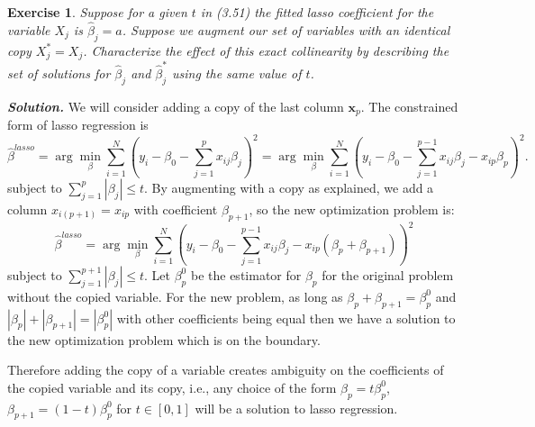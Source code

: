 \documentclass[12pt]{article}
\def\bx{\textbf{x}}
\newtheorem{exercise}{Exercise}[section]
\newenvironment{solution}[1][\it{Solution}]{\textbf{#1. } }{\vspace{.5cm}}
\begin{document}
\begin{exercise}
    Suppose for a given $t$ in (3.51) the fitted lasso coefficient for the variable $X_j$ is $\hat{\beta}_j = a$. Suppose we augment our set of variables with an identical copy $X^*_j = X_j$. Characterize the effect of this exact collinearity by describing the set of solutions for $\hat{\beta}_j$ and $\hat{\beta}_j^*$ using the same value of $t$.
\end{exercise}
\begin{solution}
    We will consider adding a copy of the last column $\bx_p$. The constrained form of lasso regression is 
    $$\hat{\beta}^{lasso} = \arg \min_\beta \sum_{i = 1}^N \left(y_i - \beta_0 - \sum_{j=1}^p x_{ij}\beta_j\right)^2 = \arg \min_\beta \sum_{i = 1}^N \left(y_i - \beta_0 - \sum_{j=1}^{p-1} x_{ij}\beta_j - x_{ip}\beta_p\right)^2.$$
    subject to $\sum_{j = 1}^p |\beta_j| \leq t$.
    By augmenting with a copy as explained, we add a column $x_{i (p+1)} = x_{ip}$ with coefficient $\beta_{p+1}$, so the new optimization problem is:
    $$\hat{\beta}^{lasso} = \arg \min_\beta \sum_{i = 1}^N \left(y_i - \beta_0 - \sum_{j=1}^{p-1} x_{ij}\beta_j - x_{ip}(\beta_p+\beta_{p+1})\right)^2$$
    subject to $\sum_{j = 1}^{p+1} |\beta_j| \leq t$. Let $\beta_p^0$ be the estimator for $\beta_p$ for the original problem without the copied variable. For the new problem, as long as $\beta_p + \beta_{p+1} = \beta_p^0$ and $|\beta_p| + |\beta_{p+1}| = |\beta_p^0|$ with other coefficients being equal then we have a solution to the new optimization problem which is on the boundary. 

    Therefore adding the copy of a variable creates ambiguity on the coefficients of the copied variable and its copy, i.e., any choice of the form $\beta_p = t\beta_p^0$, $\beta_{p+1} = (1-t)\beta_p^0$ for $t \in [0,1]$ will be a solution to lasso regression. 
\end{solution}
\end{document}

